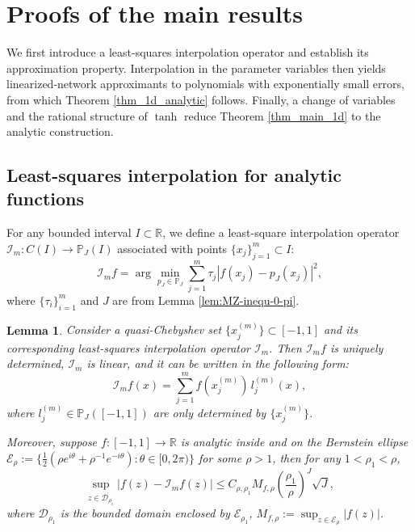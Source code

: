 \documentclass{article}
\numberwithin{equation}{section}
\newtheorem{lemma}{Lemma}
\def\RR{\mathbb{R}}
\def\lt{\left}
\def\rt{\right}
\begin{document}
\section{Proofs of the main results}\label{sec:proofs}
We first introduce a least-squares interpolation operator and establish its approximation property. Interpolation in the parameter variables then yields linearized-network approximants to polynomials with exponentially small errors, from which Theorem \ref{thm_1d_analytic} follows. Finally, a change of variables and the rational structure of $\tanh$ reduce Theorem \ref{thm_main_1d} to the analytic construction.
\subsection{Least-squares interpolation for analytic functions}
For any bounded interval $I\subset\RR$, we define a least-square interpolation operator $\mathcal I_m\colon C(I)\to \mathbb P_J(I)$ associated with points $\{x_j\}_{j=1}^m\subset I$:
\begin{equation}\label{eqn:interp-def}
    \mathcal I_m f = \arg\min_{p_J\in \mathbb P_J} \sum_{j=1}^m \tau_j |f(x_j)-p_J(x_j)|^2,
\end{equation}
where $\{\tau_i\}_{i=1}^m$ and $J$ are from Lemma \ref{lem:MZ-inequ-0-pi}.
\begin{lemma}\label{lem:least-square-interp}
    Consider a quasi-Chebyshev set $\{x_j^{(m)}\}\subset[-1,1]$ and its corresponding least-squares interpolation operator $\mathcal I_m$. Then $\mathcal I_m f$ is uniquely determined, $\mathcal I_m$ is linear, and it can be written in the following form: 
\begin{equation}\label{eqn_interp_oper}
    \mathcal I_m f(x) = \sum_{j=1}^m f(x_j^{(m)})\,l_j^{(m)}(x), 
\end{equation}
    where $l_j^{(m)}\in \mathbb P_J([-1,1])$ are only determined by $\{x_j^{(m)}\}$.
    
    Moreover, suppose $f\colon [-1,1]\to\RR$ is analytic inside and on the Bernstein ellipse $\mathcal{ E}_\rho :=\{\frac{1}{2}(\rho e^{i\theta} + \rho^{-1} e^{-i\theta}):\theta\in [0,2\pi)\}$ for some $\rho>1$, then for any $1<\rho_1<\rho$, 
    $$\sup_{z\in \overline{\mathcal{D}_{\rho_1}}} |f(z)-\mathcal I_m f(z)|\leq C_{\rho,\rho_1}M_{f,\rho}  \lt(\frac{\rho_1}{\rho}\rt)^J \sqrt{J},$$
    where $\mathcal{D}_{\rho_1}$ is the bounded domain enclosed by $\mathcal{E}_{\rho_1}$, $M_{f,\rho}:=\sup_{z\in\mathcal{E}_\rho} |f(z)|$.
\end{lemma}
\end{document}
